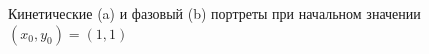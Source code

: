\documentclass[11pt]{article}
\begin{document}
\begin{enumerate}
\begin{figure}[htbp!]
{\begin{minipage}[b]{.3\linewidth}
				\end{minipage}
			}
			\caption{Кинетические (a) и фазовый (b) портреты при начальном значении $(x_0,y_0)=(1,1)$}
		\end{figure}
		\begin{figure}[htbp!]
			\centering
\end{figure}
\end{enumerate}
\end{document}
